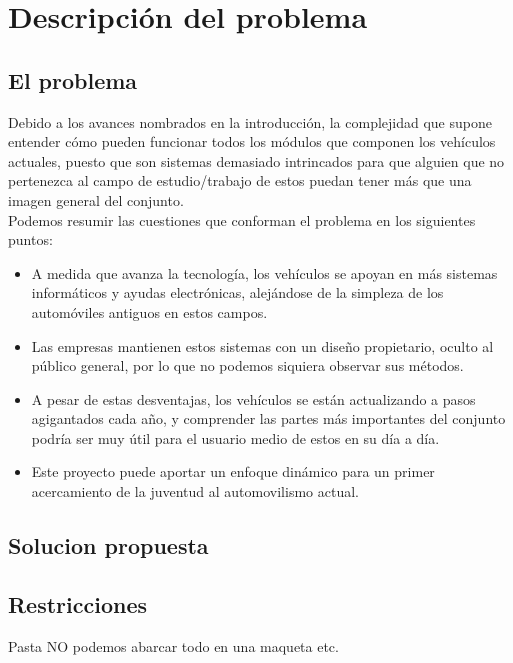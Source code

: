 \chapter{Descripción del problema}
\section{El problema}

Debido a los avances nombrados en la introducción, la complejidad que supone entender cómo pueden funcionar todos los módulos que componen los vehículos actuales, puesto que son sistemas demasiado intrincados para que alguien que no pertenezca al campo de estudio/trabajo de estos puedan tener más que una imagen general del conjunto. \\

Podemos resumir las cuestiones que conforman el problema en los siguientes puntos:

\begin{itemize}
    \item A medida que avanza la tecnología, los vehículos se apoyan en más sistemas informáticos y ayudas electrónicas, alejándose de la simpleza de los automóviles antiguos en estos campos.

    \item Las empresas mantienen estos sistemas con un diseño propietario, oculto al público general, por lo que no podemos siquiera observar sus métodos.

    \item A pesar de estas desventajas, los vehículos se están actualizando a pasos agigantados cada año, y comprender las partes más importantes del conjunto podría ser muy útil para el usuario medio de estos en su día a día.

    \item Este proyecto puede aportar un enfoque dinámico para un primer acercamiento de la juventud al automovilismo actual.
\end{itemize}





\section{Solucion propuesta}



\section{Restricciones}
Pasta
NO podemos abarcar todo en una maqueta etc.
